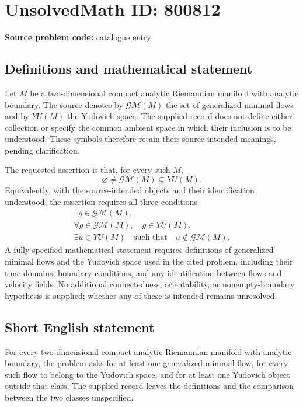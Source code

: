 \documentclass[11pt]{article}
\begin{document}
\section*{UnsolvedMath ID: 800812}
\textbf{Source problem code:} catalogue entry
\subsection{Definitions and mathematical statement}
Let \(M\) be a two-dimensional compact analytic Riemannian manifold with analytic boundary. The source denotes by \(\mathscr{GM}(M)\) the set of generalized minimal flows and by \(YU(M)\) the Yudovich space. The supplied record does not define either collection or specify the common ambient space in which their inclusion is to be understood. These symbols therefore retain their source-intended meanings, pending clarification.

The requested assertion is that, for every such \(M\),
\[
\varnothing\ne\mathscr{GM}(M)\subsetneq YU(M).
\]
Equivalently, with the source-intended objects and their identification understood, the assertion requires all three conditions
\[
\begin{gathered}
\exists g\in\mathscr{GM}(M),\\
\forall g\in\mathscr{GM}(M),\quad g\in YU(M),\\
\exists u\in YU(M)\quad\text{such that}\quad u\notin\mathscr{GM}(M).
\end{gathered}
\]
A fully specified mathematical statement requires definitions of generalized minimal flows and the Yudovich space used in the cited problem, including their time domains, boundary conditions, and any identification between flows and velocity fields. No additional connectedness, orientability, or nonempty-boundary hypothesis is supplied; whether any of these is intended remains unresolved.
\subsection{Short English statement}
For every two-dimensional compact analytic Riemannian manifold with analytic boundary, the problem asks for at least one generalized minimal flow, for every such flow to belong to the Yudovich space, and for at least one Yudovich object outside that class. The supplied record leaves the definitions and the comparison between the two classes unspecified.
\end{document}
